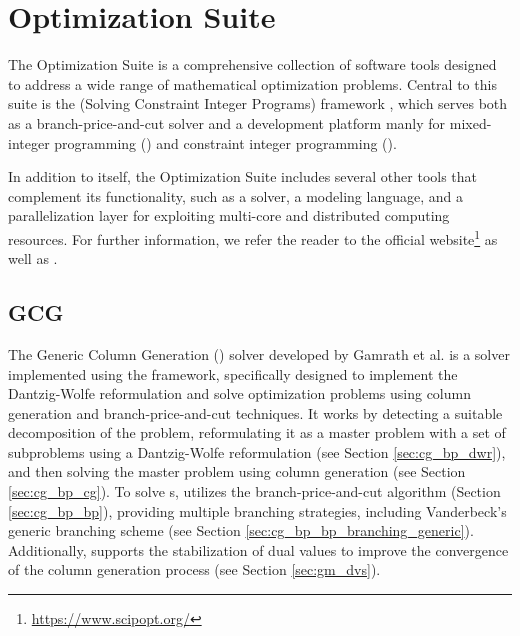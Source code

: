 \chapter{\SCIP{} Optimization Suite}\label{ch:tools}
The \SCIP{} Optimization Suite is a comprehensive collection of software tools designed to address a wide range of mathematical optimization problems. Central to this suite is the \SCIP{} (Solving Constraint Integer Programs) framework \cite{achterberg2007constraint, achterberg2009scip}, which serves both as a branch-price-and-cut solver and a development platform manly for mixed-integer programming (\MIP{}) and constraint integer programming (\CIP{}).

In addition to \SCIP{} itself, the \SCIP{} Optimization Suite includes several other tools that complement its functionality, such as a \LP{} solver, a modeling language, and a parallelization layer for exploiting multi-core and distributed computing resources. For further information, we refer the reader to the official \SCIP{} website\footnote{\url{https://www.scipopt.org/}} as well as \cite{bolusani2024scip}.

\section{GCG}\label{sec:tools_gcg}
The Generic Column Generation (\GCG{}) solver developed by Gamrath et al. \cite{gamrath2010generic} is a solver implemented using the \SCIP{} framework, specifically designed to implement the Dantzig-Wolfe reformulation and solve optimization problems using column generation and branch-price-and-cut techniques. It works by detecting a suitable decomposition of the problem, reformulating it as a master problem with a set of subproblems using a Dantzig-Wolfe reformulation (see Section \ref{sec:cg_bp_dwr}), and then solving the master problem using column generation (see Section \ref{sec:cg_bp_cg}). To solve \MIP{}s, \GCG{} utilizes the branch-price-and-cut algorithm (Section \ref{sec:cg_bp_bp}), providing multiple branching strategies, including Vanderbeck's generic branching scheme (see Section \ref{sec:cg_bp_bp_branching_generic}). Additionally, \GCG{} supports the stabilization of dual values to improve the convergence of the column generation process (see Section \ref{sec:gm_dvs}).
